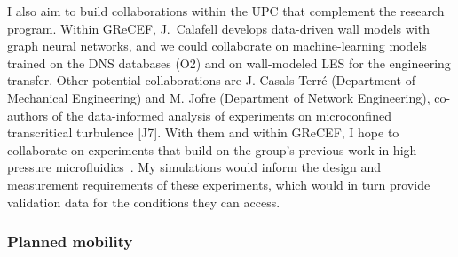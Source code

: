 \documentclass[11pt]{article}
\begin{document}
I also aim to build collaborations within the UPC that
complement the research program.
Within GReCEF, J.\ Calafell develops data-driven wall models with graph neural networks, and we could collaborate on machine-learning models trained on the DNS databases (O2) and on wall-modeled LES for the engineering transfer.
Other potential collaborations are J. Casals-Terr\'e (Department of Mechanical Engineering) and M. Jofre (Department of Network Engineering), co-authors of the data-informed analysis of experiments on microconfined transcritical turbulence [J7].
With them and within GReCEF, I hope to collaborate on experiments that build on the group's previous work in high-pressure microfluidics~\cite{Hurtan2025}. My simulations would inform the design and measurement requirements of these experiments, which would in turn provide validation data for the conditions they can access.

\subsubsection{Planned mobility}
\end{document}
